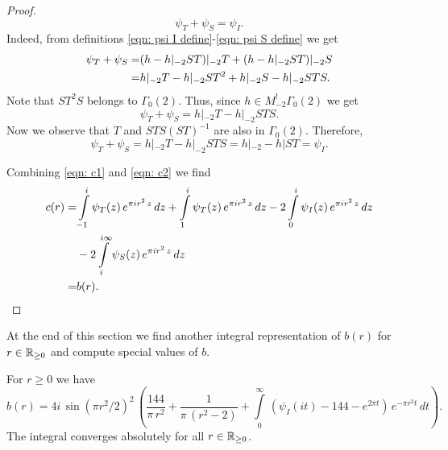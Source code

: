 \begin{proof}
\begin{equation}\label{eqn: c2}\psi_T+\psi_S=\psi_I.\end{equation}
Indeed, from definitions \eqref{eqn: psi I define}-\eqref{eqn: psi S define} we get
\begin{align}\psi_T+\psi_S=&(h-h|_{-2}ST)|_{-2}T+(h-h|_{-2}ST)|_{-2}S\notag\\
=&h|_{-2}T-h|_{-2}ST^2+h|_{-2}S-h|_{-2}STS.\notag\end{align}
Note that $ST^2S$ belongs to $\Gamma_0(2)$. Thus, since $h\in M^!_{-2}\Gamma_0(2)$ we get
$$\psi_T+\psi_S=h|_{-2}T-h|_{-2}STS. $$
Now we observe that $T$ and $STS(ST)^{-1}$ are also in $\Gamma_0(2)$. Therefore,
$$\psi_T+\psi_S=h|_{-2}T-h|_{-2}STS=h|_{-2}-h|ST=\psi_I.$$

Combining \eqref{eqn: c1} and \eqref{eqn: c2} we find
\begin{align}c(r)=&\int\limits_{-1}^{i}\psi_T(z)\,e^{\pi i r^2 \,z}\,dz+\int\limits_{1}^{i}\psi_T(z)\,e^{\pi i r^2 \,z}\,dz
-2\int\limits_{0}^{i}\psi_I(z)\,e^{\pi i r^2 \,z}\,dz\notag\\
&-2\int\limits_{i}^{i\infty}\psi_S(z)\,e^{\pi i r^2 \,z}\,dz\notag\\
=&b(r).\notag
    \end{align}
\end{proof}
At the end of this section we find another integral representation of $b(r)$ for $r\in\mathbb{R}_{\geq0}$ and compute special values of $b$.
\begin{proposition}\label{prop: b another integral}
For $r\geq0$ we have
\begin{equation}\label{eqn: b another integral}b(r)=4i\,\sin(\pi r^2/2)^2\,\left(\frac{144}{\pi\,r^2}+\frac{1}{\pi\,(r^2-2)}+\int\limits_0^\infty\,\left(\psi_I(it)-144-e^{2\pi t}\right)\,e^{-\pi r^2 t}\,dt\right).\end{equation}
The integral converges absolutely for all $r\in\mathbb{R}_{\geq 0}$.
\end{proposition}
